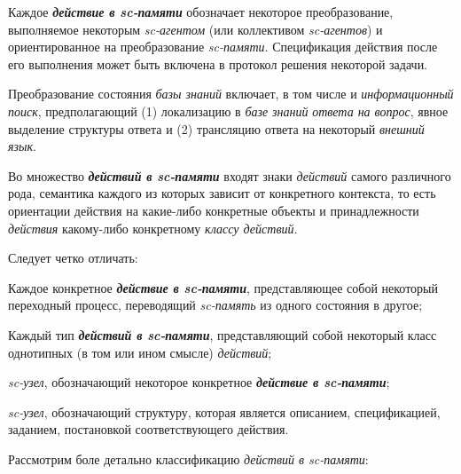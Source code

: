 Каждое \textbf{\textit{действие в sc-памяти}} обозначает некоторое преобразование, выполняемое некоторым \textit{sc-агентом} (или коллективом \textit{sc-агентов}) и ориентированное на преобразование \textit{sc-памяти}. Спецификация действия после его выполнения может быть включена в протокол решения некоторой задачи. 
	
Преобразование состояния \textit{базы знаний} включает, в том числе и \textit{информационный поиск}, предполагающий (1) локализацию в \textit{базе знаний} \textit{ответа на вопрос}, явное выделение структуры ответа и (2) трансляцию ответа на некоторый \textit{внешний язык}.

Во множество \textbf{\textit{действий в sc-памяти}} входят знаки \textit{действий} самого различного рода, семантика каждого из которых зависит от конкретного контекста, то есть ориентации действия на какие-либо конкретные объекты и принадлежности \textit{действия} какому-либо конкретному \textit{классу действий}.

Следует четко отличать:
\begin{textitemize}
	\item Каждое конкретное \textbf{\textit{действие в sc-памяти}}, представляющее собой некоторый переходный процесс, переводящий \textit{sc-память} из одного состояния в другое;
	\item Каждый тип \textbf{\textit{действий в sc-памяти}}, представляющий собой некоторый класс однотипных (в том или ином смысле) \textit{действий};
	\item \textit{sc-узел}, обозначающий некоторое конкретное \textbf{\textit{действие в sc-памяти}};
	\item \textit{sc-узел}, обозначающий структуру, которая является описанием, спецификацией, заданием, постановкой соответствующего действия.
\end{textitemize}

Рассмотрим боле детально классификацию \textit{действий в sc-памяти}:

